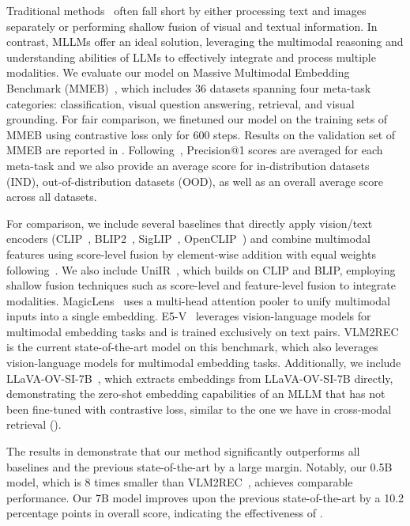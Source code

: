 %
Traditional methods~\citep{radford2021learning,li2023blip,zhai2023sigmoid,cherti2023reproducible} often fall short by either processing text and images separately or performing shallow fusion of visual and textual information. 
%
In contrast, MLLMs offer an ideal solution, leveraging the multimodal reasoning and understanding abilities of LLMs to effectively integrate and process multiple modalities.
%
We evaluate our model on Massive Multimodal Embedding Benchmark (MMEB)~\citep{jiang2024vlm2vec}, which includes 36 datasets spanning four meta-task categories: classification, visual question answering, retrieval, and visual grounding. 
%
For fair comparison, we finetuned our model on the training sets of MMEB using contrastive loss only for 600 steps. 
%
Results on the validation set of MMEB are reported in . 
%
Following~\cite{jiang2024vlm2vec}, Precision@1 scores are averaged for each meta-task and we also provide an average score for in-distribution datasets (IND), out-of-distribution datasets (OOD), as well as an overall average score across all datasets. 
%

For comparison, we include several baselines that directly apply vision/text encoders (CLIP~\citep{radford2021learning}, BLIP2~\citep{li2023blip}, SigLIP~\citep{zhai2023sigmoid}, OpenCLIP~\citep{cherti2023reproducible}) and combine multimodal features using score-level fusion by element-wise addition with equal weights following~\cite{jiang2024vlm2vec}. 
%
We also include UniIR~\citep{wei2023uniir}, which builds on CLIP and BLIP, employing shallow fusion techniques such as score-level and feature-level fusion to integrate modalities. 
%
MagicLens~\citep{zhang2024magiclens} uses a multi-head attention pooler to unify multimodal inputs into a single embedding. 
%
E5-V~\citep{jiang2024e5} leverages vision-language models for multimodal embedding tasks and is trained exclusively on text pairs. 
%
VLM2REC~\citep{jiang2024vlm2vec} is the current state-of-the-art model on this benchmark, which also leverages vision-language models for multimodal embedding tasks. 
%
Additionally, we include LLaVA-OV-SI-7B~\citep{li2024llava}, which extracts embeddings from LLaVA-OV-SI-7B directly, demonstrating the zero-shot embedding capabilities of an MLLM that has not been fine-tuned with contrastive loss, similar to the one we have in cross-modal retrieval ().
%

The results in  demonstrate that our method significantly outperforms all baselines and the previous state-of-the-art by a large margin. 
%
Notably, our 0.5B model, which is 8 times smaller than VLM2REC~\citep{jiang2024vlm2vec}, achieves comparable performance. 
%
Our 7B model improves upon the previous state-of-the-art by a 10.2 percentage points in overall score, indicating the effectiveness of \algname.
%


